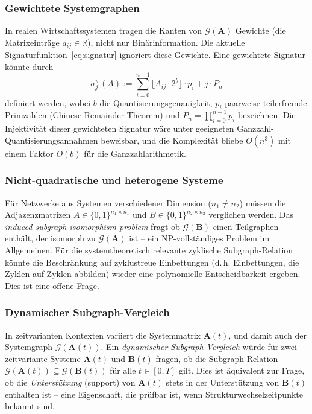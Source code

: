 \documentclass[a4paper, 12pt, twoside, openright]{report}
\theoremstyle{definition}
\theoremstyle{definition}
\newcommand{\R}{\mathbb{R}}
\newcommand{\vA}{\bm{A}}
\newcommand{\vB}{\bm{B}}
\begin{document}
\subsubsection*{Gewichtete Systemgraphen}

In realen Wirtschaftssystemen tragen die Kanten von $\mathcal{G}(\vA)$ Gewichte
(die Matrixeinträge $a_{ij} \in \R$), nicht nur Binärinformation. Die aktuelle
Signaturfunktion~\eqref{eq:signatur} ignoriert diese Gewichte. Eine gewichtete
Signatur könnte durch
\begin{equation}
  \sigma_j^w(A) := \sum_{i=0}^{n-1} \lfloor A_{ij} \cdot 2^b \rfloor \cdot p_i + j \cdot P_n
  \label{eq:weight_sig}
\end{equation}
definiert werden, wobei $b$ die Quantisierungsgenauigkeit, $p_i$ paarweise teilerfremde
Primzahlen (Chinese Remainder Theorem) und $P_n = \prod_{i=0}^{n-1} p_i$ bezeichnen.
Die Injektivität dieser gewichteten Signatur wäre unter geeigneten Ganzzahl-
Quantisierungsannahmen beweisbar, und die Komplexität bliebe $O(n^3)$ mit einem
Faktor $O(b)$ für die Ganzzahlarithmetik.

\subsubsection*{Nicht-quadratische und heterogene Systeme}

Für Netzwerke aus Systemen verschiedener Dimension ($n_1 \neq n_2$) müssen die
Adjazenzmatrizen $A \in \{0,1\}^{n_1 \times n_1}$ und $B \in \{0,1\}^{n_2 \times n_2}$
verglichen werden. Das \emph{induced subgraph isomorphism problem} fragt ob
$\mathcal{G}(\vB)$ einen Teilgraphen enthält, der isomorph zu $\mathcal{G}(\vA)$ ist --
ein NP-vollständiges Problem im Allgemeinen. Für die systemtheoretisch relevante
zyklische Subgraph-Relation könnte die Beschränkung auf zyklustreue Einbettungen
(d.\,h. Einbettungen, die Zyklen auf Zyklen abbilden) wieder eine polynomielle
Entscheidbarkeit ergeben. Dies ist eine offene Frage.

\subsubsection*{Dynamischer Subgraph-Vergleich}

In zeitvarianten Kontexten variiert die Systemmatrix $\vA(t)$, und damit auch
der Systemgraph $\mathcal{G}(\vA(t))$. Ein \emph{dynamischer Subgraph-Vergleich}
würde für zwei zeitvariante Systeme $\vA(t)$ und $\vB(t)$ fragen, ob die
Subgraph-Relation $\mathcal{G}(\vA(t)) \subseteq \mathcal{G}(\vB(t))$ für alle
$t \in [0, T]$ gilt. Dies ist äquivalent zur Frage, ob die \emph{Unterstützung}
(support) von $\vA(t)$ stets in der Unterstützung von $\vB(t)$ enthalten ist --
eine Eigenschaft, die prüfbar ist, wenn Strukturwechselzeitpunkte bekannt sind.
\end{document}
